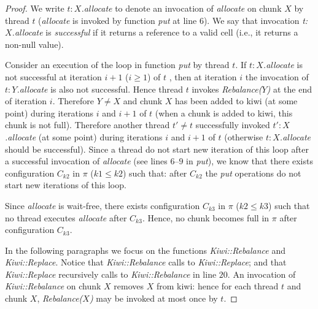 \begin{proof}
{We write \emph{$t:X$.allocate} to denote an invocation of \emph{allocate} on chunk $X$ by thread $t$
(\emph{allocate} is invoked by function \emph{put} at line $6$).
We say that invocation \emph{t:$X$.allocate} is \emph{successful}
if it returns a reference to a valid cell (i.e., it returns a non-null value).

Consider an execution of the loop in function \emph{put} by thread $t$.
If \emph{$t:X$.allocate} is not successful at iteration $i+1$ ($i \geq 1$) of $t$ ,
then at iteration $i$ the invocation of \emph{$t:Y$.allocate} is also not successful.
Hence thread $t$ invokes \emph{Rebalance($Y$)} at the end of iteration $i$.
Therefore $Y \neq X$ and chunk $X$ has been added to kiwi (at some point) during iterations $i$ and $i+1$ of $t$
(when a chunk is added to kiwi, this chunk is not full).
Therefore another thread $t' \neq t$ successfully invoked \emph{$t':X$.allocate} (at some point) during iterations $i$ and $i+1$ of $t$
(otherwise \emph{$t:X$.allocate} should be successful).
%
Since a thread do not start new iteration of this loop after a successful invocation of \emph{allocate} (see lines $6$--$9$ in \emph{put}),
 we know that there exists configuration $C_{k2}$ in $\pi$ ($k1 \leq k2$) such that:
after $C_{k2}$ the \emph{put} operations do not start new iterations of this loop.

Since \emph{allocate} is wait-free, there exists configuration $C_{k3}$ in $\pi$ ($k2 \leq k3$) such that
no thread executes \emph{allocate} after $C_{k3}$.
Hence, no chunk becomes full in $\pi$ after configuration $C_{k3}$.



In the following paragraphs we focus on the functions \emph{Kiwi::Rebalance} and \emph{Kiwi::Replace}.
Notice that \emph{Kiwi::Rebalance} calls to \emph{Kiwi::Replace}; and that \emph{Kiwi::Replace} recursively calls to \emph{Kiwi::Rebalance} in line $20$.
An invocation of \emph{Kiwi::Rebalance} on chunk $X$ removes $X$ from kiwi:
hence for each thread $t$ and chunk $X$, \emph{Rebalance($X$)} may be invoked at most once by $t$.

}
\end{proof}
